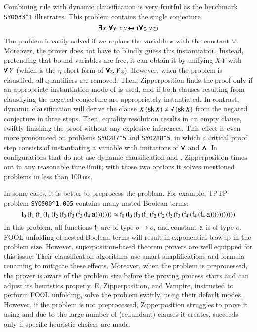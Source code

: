 Combining rule  with dynamic clausification is very fruitful as
the benchmark \texttt{SYO033\^{}1} illustrates. This problem contains the
single conjecture
$$ \pmb{\exists} x. \, \pmb{\forall} y.  \, x \, y \pmb{\leftrightarrow} (\pmb{\forall} z. \, y \,z)$$ The
problem is easily solved if we replace the variable $x$ with the constant $\forall$.
Moreover, the prover does not have to blindly guess this instantiation. Instead,
pretending that bound variables are free, it can obtain it by unifying $  X \, Y
$ with $ \pmb{\forall} \, Y$ (which is the $\eta$-short form of $\pmb{\forall} z. \, Y
\,z$). However, when the problem is clausified, all quantifiers are removed.
Then, Zipperposition finds the proof only if an appropriate instantiation mode of
 is used, and if both clauses resulting from clausifying the negated
conjecture are appropriately instantiated. In contrast, dynamic clausification will
derive the clause $ X \, (\cst{sk} \, X) \not\eq \forall \, (\cst{sk} \, X) $
from the negated conjecture in three steps. Then, equality resolution results in
an empty clause, swiftly finishing the proof without any explosive inferences.
This effect is even more pronounced on problems \verb|SYO287^5| and
\verb|SYO288^5|, in which a critical proof step consists of instantiating a variable
with imitations of $\pmb{\lor}$ and $\pmb{\land}$. In configurations that do not use dynamic
clausification and , Zipperposition times out in any reasonable
time limit; with those two options it solves mentioned problems in less than
100\,ms.

In some cases, it is better to preprocess the problem. For example, TPTP problem
\verb|SYO500^1.005| contains many nested Boolean terms:
$$ \mathsf{f}_0 \, ( \mathsf{f}_1 \, ( \mathsf{f}_1 \, ( \mathsf{f}_1 \, ( \mathsf{f}_2 \, ( \mathsf{f}_3 \, ( \mathsf{f}_3 \, ( \mathsf{f}_3 \, ( \mathsf{f}_4 \, \mathsf{a} ) ) ) ) ) ) ) 
    \approx \mathsf{f}_0 \, ( \mathsf{f}_0 \, ( \mathsf{f}_0 \, ( \mathsf{f}_1 \, ( \mathsf{f}_2 \, ( \mathsf{f}_2 \, ( \mathsf{f}_2 \, ( \mathsf{f}_3 \, ( \mathsf{f}_4 \, ( \mathsf{f}_4 \, ( \mathsf{f}_4 \, \mathsf{a} ) ) ) ) ) ) ) ) ) ) )$$
In this problem, all functions $\mathsf{f}_i$ are of type $o \rightarrow o$, and constant $\mathsf{a}$ is of type $o$.
FOOL unfolding of nested Boolean terms will result in exponential blowup in the problem size. However,
superposition-based theorem provers are well equipped for this issue: Their clausification algorithms use smart simplifications and
formula renaming to mitigate these effects. Moreover, when the problem is preprocessed, the prover is aware of the problem
size before the proving process starts and can adjust its heuristics properly. E, Zipperposition, and Vampire, instructed to perform FOOL unfolding,
solve the problem swiftly, using their default modes. However, if the problem is not preprocessed, Zipperposition struggles to prove it using
 and due to the large number of (redundant) clauses it creates, succeeds only if specific heuristic choices are made.

